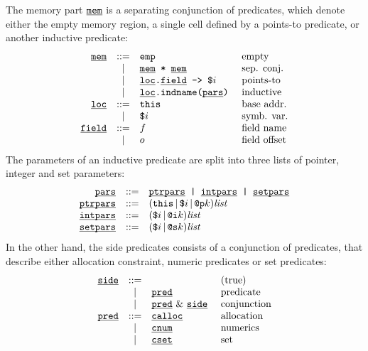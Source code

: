 The memory part \( \underline{\smash{\texttt{mem}}} \) is a separating conjunction of predicates,
which denote either the empty memory region, a single cell defined by
a points-to predicate, or another inductive predicate:
\[
\begin{array}{rcll}
  \underline{\smash{\texttt{mem}}}
  & ::=
  & \texttt{emp}
  & \text{ empty}
  \\
  & |
  & \underline{\smash{\texttt{mem}}} \texttt{ * } \underline{\smash{\texttt{mem}}}
  & \text{ sep. conj.}
  \\
  & |
  & \underline{\smash{\texttt{loc}}} \texttt{.} \underline{\smash{\texttt{field}}} \texttt{ -> } \texttt{\$}i
  & \text{ points-to}
  \\
  & |
  & \underline{\smash{\texttt{loc}}} \texttt{.} \texttt{indname} \texttt{(} \underline{\smash{\texttt{pars}}} \texttt{)}
  & \text{ inductive}
  \\
  \underline{\smash{\texttt{loc}}}
  & ::=
  & \texttt{this}
  & \text{ base addr.}
  \\
  & |
  & \texttt{\$}i
  & \text{ symb. var.}
  \\
  \underline{\smash{\texttt{field}}}
  & ::=
  & f
  & \text{ field name}
  \\
  & |
  & o
  & \text{ field offset}
\end{array}
\]
The parameters of an inductive predicate are split into three lists of
pointer, integer and set parameters:
\[
\begin{array}{rcl}
  \underline{\smash{\texttt{pars}}}
  & ::=
  & \underline{\smash{\texttt{ptrpars}}} \texttt{ | } \underline{\smash{\texttt{intpars}}} \texttt{ | } \underline{\smash{\texttt{setpars}}}
  \\
  \underline{\smash{\texttt{ptrpars}}}
  & ::=
  & (\texttt{this} \, | \, \texttt{\$}i \, | \, \texttt{@p}k) \textit{list}
  \\
  \underline{\smash{\texttt{intpars}}}
  & ::=
  & (\texttt{\$}i \, | \, \texttt{@i}k) \textit{list}
  \\
  \underline{\smash{\texttt{setpars}}}
  & ::=
  & (\texttt{\$}i \, | \, \texttt{@s}k) \textit{list}
  \\
\end{array}
\]
In the other hand, the side predicates consists of a conjunction
of predicates, that describe either allocation constraint, numeric
predicates or set predicates:
\[
\begin{array}{rcll}
  \underline{\smash{\texttt{side}}}
  & ::=
  &
  & \text{ (true)}
  \\
  & |
  & \underline{\smash{\texttt{pred}}}
  & \text{ predicate}
  \\
  & |
  & \underline{\smash{\texttt{pred}}} \text{ \& } \underline{\smash{\texttt{side}}}
  & \text{ conjunction}
  \\
  \underline{\smash{\texttt{pred}}}
  & ::=
  & \underline{\smash{\texttt{calloc}}}
  & \text{ allocation}
  \\
  & |
  & \underline{\smash{\texttt{cnum}}}
  & \text{ numerics}
  \\
  & |
  & \underline{\smash{\texttt{cset}}}
  & \text{ set}
  \\
\end{array}
\]
